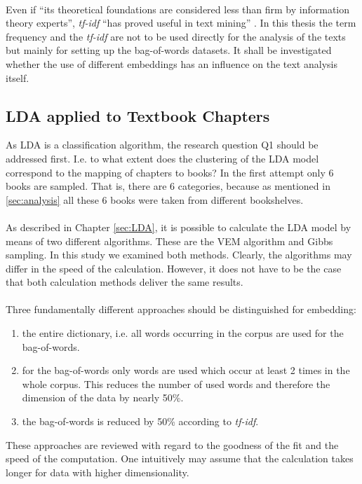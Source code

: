 \documentclass[11pt,a4paper]{article}
\begin{document}
\ \\
Even if “its theoretical foundations are considered less than firm by information theory experts”, \textit{tf-idf} “has proved useful in text mining” \cite{Silge2017}. In this thesis the term frequency and the \textit{tf-idf} are not to be used directly for the analysis of the texts but mainly for setting up the bag-of-words datasets. It shall be investigated whether the use of different embeddings has an influence on the text analysis itself.

\subsection{LDA applied to Textbook Chapters} \label{Example1}

As LDA is a classification algorithm, the research question Q1 should be addressed first. I.e. to what extent does the clustering of the LDA model correspond to the mapping of chapters to books? In the first attempt only 6 books are sampled. That is, there are 6 categories, because as mentioned in \ref{sec:analysis} all these 6 books were taken from different bookshelves.\\
\ \\
As described in Chapter \ref{sec:LDA}, it is possible to calculate the LDA model by means of two different algorithms. These are the VEM algorithm and Gibbs sampling. In this study we examined both methods. Clearly, the algorithms may differ in the speed of the calculation. However, it does not have to be the case that both calculation methods deliver the same results.\\
\ \\
Three fundamentally different approaches should be distinguished for embedding:
\begin{enumerate}
	\item the entire dictionary, i.e. all words occurring in the corpus are used for the bag-of-words.	
	\item for the bag-of-words only words are used which occur at least 2 times in the whole corpus. This reduces the number of used words and therefore the dimension of the data by nearly 50\%.
	\item the bag-of-words is reduced by 50\% according to \textit{tf-idf}.
\end{enumerate}
These approaches are reviewed with regard to the goodness of the fit and the speed of the computation. One intuitively may assume that the calculation takes longer for data with higher dimensionality.\\
\end{document}

